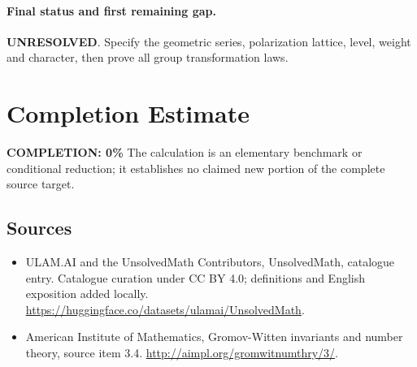 \documentclass[11pt]{article}
\begin{document}
\paragraph{Final status and first remaining gap.}
\textbf{UNRESOLVED}. Specify the geometric series, polarization lattice, level, weight and character, then prove all group transformation laws.

\section{Completion Estimate}
\noindent\textbf{COMPLETION: 0\%}
The calculation is an elementary benchmark or conditional reduction; it establishes no claimed new portion of the complete source target.

\subsection{Sources}
\begin{itemize}
\item[\hypertarget{source:statement:1}{S1}] ULAM.AI and the UnsolvedMath Contributors, UnsolvedMath, catalogue entry. Catalogue curation under CC BY 4.0; definitions and English exposition added locally.
\url{https://huggingface.co/datasets/ulamai/UnsolvedMath}.
\item[\hypertarget{source:statement:2}{S2}] American Institute of Mathematics, Gromov-Witten invariants and number theory, source item 3.4.
\url{http://aimpl.org/gromwitnumthry/3/}.
\end{itemize}
\label{end:statement}
\end{document}
